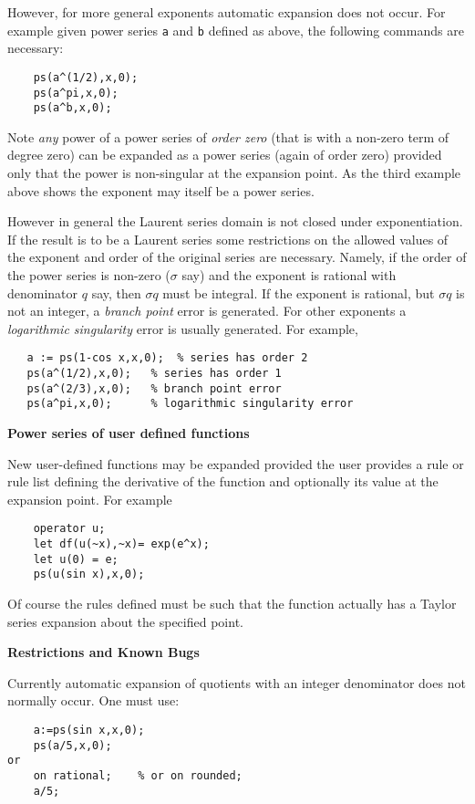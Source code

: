However, for more general exponents automatic expansion does not occur. For
example given power series \texttt{a} and \texttt{b} defined as above, the
following commands are necessary:
\begin{verbatim}
    ps(a^(1/2),x,0);
    ps(a^pi,x,0);
    ps(a^b,x,0);
\end{verbatim}
Note \emph{any} power of a power series of \emph{order zero} (that is with a
non-zero term of degree zero) can be expanded as a power series (again of
order zero) provided only that the power is non-singular at the expansion point.
As the third example above shows the exponent may itself be a power series.

However in general the Laurent series domain is not closed under exponentiation.
If the result is to be a Laurent series some restrictions 
on the allowed values of the exponent and order of the original series are
necessary. Namely, if the order of the power series is non-zero ($\sigma$ say)
and the exponent is rational with denominator $q$ say, then $\sigma q$ must be
integral.  If the exponent is rational, but $\sigma q$ is not an integer,
a \emph{branch point} error is generated. For other exponents a
\emph{logarithmic singularity} error is usually generated. For example,
\begin{verbatim}
   a := ps(1-cos x,x,0);  % series has order 2
   ps(a^(1/2),x,0);   % series has order 1
   ps(a^(2/3),x,0);   % branch point error
   ps(a^pi,x,0);      % logarithmic singularity error
\end{verbatim}

\textbf{Power series of user defined functions}

New user-defined functions may be expanded provided the user provides
a rule or rule list defining the derivative of the function and optionally
its value at the expansion point. For example
\begin{verbatim}
    operator u;
    let df(u(~x),~x)= exp(e^x);
    let u(0) = e;
    ps(u(sin x),x,0);
\end{verbatim}
Of course the rules defined must be such that the function actually has a
Taylor series expansion about the specified point.

\textbf{Restrictions and Known Bugs}

Currently automatic expansion of quotients with an integer denominator does not
normally occur. One must use:
\begin{verbatim}
    a:=ps(sin x,x,0);
    ps(a/5,x,0);
or
    on rational;    % or on rounded;
    a/5;
\end{verbatim}

